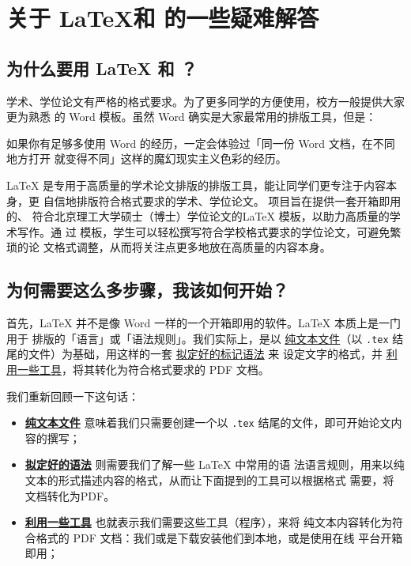 \chapter{关于 \LaTeX 和 \BIThesis 的一些疑难解答}
\label{chap:what}

\section{为什么要用 \LaTeX{} 和 \BIThesis{}？}

学术、学位论文有严格的格式要求。为了更多同学的方便使用，校方一般提供大家更为熟悉
的 Word 模板。虽然 Word 确实是大家最常用的排版工具，但是：
\begin{center}
  \kaishu
  如果你有足够多使用 Word 的经历，一定会体验过「同一份 Word 文档，在不同地方打开
  就变得不同」这样的魔幻现实主义色彩的经历。
\end{center}

\LaTeX{} 是专用于高质量的学术论文排版的排版工具，能让同学们更专注于内容本身，更
自信地排版符合格式要求的学术、学位论文。\BIThesis{} 项目旨在提供一套开箱即用的、
符合北京理工大学硕士（博士）学位论文的\LaTeX{} 模板，以助力高质量的学术写作。通
过 \BIThesis{} 模板，学生可以轻松撰写符合学校格式要求的学位论文，可避免繁琐的论
文格式调整，从而将关注点更多地放在高质量的内容本身。

\section{为何需要这么多步骤，我该如何开始？}

首先，\LaTeX{} 并不是像 Word 一样的一个开箱即用的软件。\LaTeX{} 本质上是一门用于
排版的「语言」或「语法规则」。我们实际上，是以 \underline{纯文本文件}（以
\texttt{.tex} 结尾的文件）为基础，用这样的一套 \underline{拟定好的标记语法} 来
设定文字的格式，并 \underline{利用一些工具}，将其转化为符合格式要求的 PDF 文档。

我们重新回顾一下这句话：

\begin{itemize}[noitemsep]
  \item \textbf{\underline{纯文本文件}} 意味着我们只需要创建一个以 \texttt{.tex}
  结尾的文件，即可开始论文内容的撰写；
  \item \textbf{\underline{拟定好的语法}} 则需要我们了解一些 \LaTeX{} 中常用的语
  法语言规则，用来以纯文本的形式描述内容的格式，从而让下面提到的工具可以根据格式
  需要，将文档转化为PDF。
  \item \textbf{\underline{利用一些工具}} 也就表示我们需要这些工具（程序），来将
  纯文本内容转化为符合格式的 PDF 文档：我们或是下载安装他们到本地，或是使用在线
  平台开箱即用；
\end{itemize}

